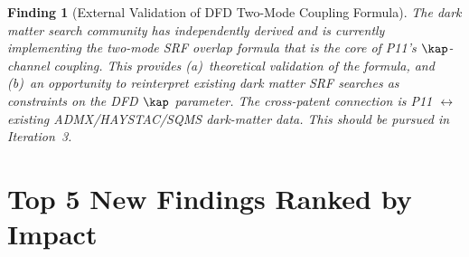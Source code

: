 \documentclass[11pt,twocolumn]{article}
\newtheorem{finding}{Finding}
\begin{document}
\begin{finding}[External Validation of DFD Two-Mode Coupling Formula]
\label{find:external_validation}
The dark matter search community has independently derived and is currently
implementing the two-mode SRF overlap formula that is the core of P11's
$\kap$-channel coupling. This provides (a)~theoretical validation of the
formula, and (b)~an opportunity to reinterpret existing dark matter SRF
searches as constraints on the DFD $\kap$ parameter. The cross-patent
connection is P11 $\leftrightarrow$ existing ADMX/HAYSTAC/SQMS dark-matter
data. This should be pursued in Iteration~3.
\end{finding}


\section{Top 5 New Findings Ranked by Impact}
\label{sec:top5}
\end{document}
